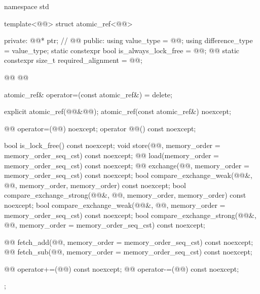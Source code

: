 \begin{codeblock}
namespace std {
  template<@@> struct atomic_ref<@@> {
  private:
    @@* ptr;  // \expos
    @@
  public:
    using value_type = @@;
    using difference_type = value_type;
    static constexpr bool is_always_lock_free = @@;
    @@
    static constexpr size_t required_alignment = @@;

    @@
    @@

    atomic_ref& operator=(const atomic_ref&) = delete;

    explicit atomic_ref(@@&@@);
    atomic_ref(const atomic_ref&) noexcept;

    @@ operator=(@@) noexcept;
    operator @@() const noexcept;

    bool is_lock_free() const noexcept;
    void store(@@, memory_order = memory_order_seq_cst) const noexcept;
    @@ load(memory_order = memory_order_seq_cst) const noexcept;
    @@ exchange(@@,
                            memory_order = memory_order_seq_cst) const noexcept;
    bool compare_exchange_weak(@@&, @@,
                               memory_order, memory_order) const noexcept;
    bool compare_exchange_strong(@@&, @@,
                                 memory_order, memory_order) const noexcept;
    bool compare_exchange_weak(@@&, @@,
                               memory_order = memory_order_seq_cst) const noexcept;
    bool compare_exchange_strong(@@&, @@,
                                 memory_order = memory_order_seq_cst) const noexcept;

    @@ fetch_add(@@,
                             memory_order = memory_order_seq_cst) const noexcept;
    @@ fetch_sub(@@,
                             memory_order = memory_order_seq_cst) const noexcept;

    @@ operator+=(@@) const noexcept;
    @@ operator-=(@@) const noexcept;
  };
}
\end{codeblock}

